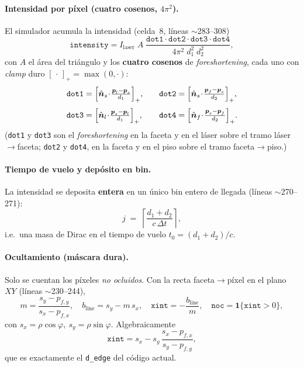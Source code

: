 \documentclass[11pt,a4paper]{article}
\theoremstyle{plain}
\theoremstyle{definition}
\newcommand{\vect}[1]{\boldsymbol{#1}}
\begin{document}
\paragraph{Intensidad por p\'ixel (cuatro cosenos, $4\pi^2$).}
El simulador acumula la intensidad (celda~8, l\'ineas $\sim$283--308)
\begin{equation}
    \texttt{intensity}
    =
    I_{\mathrm{laser}}\; A\;
    \frac{\texttt{dot1}\cdot\texttt{dot2}\cdot\texttt{dot3}\cdot\texttt{dot4}}
         {4\pi^2\; d_1^2\; d_2^2},
    \label{eq:raster-int}
\end{equation}
con $A$ el \'area del tri\'angulo y los \textbf{cuatro cosenos} de
\emph{foreshortening}, cada uno con \emph{clamp} duro $[\,\cdot\,]_+=\max(0,\cdot)$:
\begin{equation}
\begin{aligned}
    \texttt{dot1}&=\Bigl[\hat{\vect n}_s\!\cdot\!\tfrac{\vect{p}_l-\vect{p}_s}{d_1}\Bigr]_+,
    &\quad
    \texttt{dot2}&=\Bigl[\hat{\vect n}_s\!\cdot\!\tfrac{\vect{p}_f-\vect{p}_s}{d_2}\Bigr]_+,\\[3pt]
    \texttt{dot3}&=\Bigl[\hat{\vect n}_l\!\cdot\!\tfrac{\vect{p}_s-\vect{p}_l}{d_1}\Bigr]_+,
    &\quad
    \texttt{dot4}&=\Bigl[\hat{\vect n}_f\!\cdot\!\tfrac{\vect{p}_s-\vect{p}_f}{d_2}\Bigr]_+ .
\end{aligned}
    \label{eq:raster-cos}
\end{equation}
(\texttt{dot1} y \texttt{dot3} son el \emph{foreshortening} en la faceta y en el
l\'aser sobre el tramo l\'aser$\to$faceta; \texttt{dot2} y \texttt{dot4}, en la
faceta y en el piso sobre el tramo faceta$\to$piso.)

\paragraph{Tiempo de vuelo y dep\'osito en bin.}
La intensidad se deposita \textbf{entera} en un \'unico bin entero de llegada
(l\'ineas $\sim$270--271):
\begin{equation}
    j \;=\; \left\lceil \frac{d_1+d_2}{c\,\Delta t} \right\rceil ,
    \label{eq:raster-ceil}
\end{equation}
i.e.\ una masa de Dirac en el tiempo de vuelo $t_0=(d_1+d_2)/c$.

\paragraph{Ocultamiento (m\'ascara dura).}
Solo se cuentan los p\'ixeles \emph{no ocluidos}. Con la recta faceta$\to$p\'ixel
en el plano $XY$ (l\'ineas $\sim$230--244),
\begin{equation}
    m=\frac{s_y-p_{f,y}}{s_x-p_{f,x}},\quad
    b_{\mathrm{line}}=s_y-m\,s_x,\quad
    \texttt{xint}=-\frac{b_{\mathrm{line}}}{m},\quad
    \texttt{noc}=\mathbf 1\{\texttt{xint}>0\},
    \label{eq:raster-noc}
\end{equation}
con $s_x=\rho\cos\varphi,\ s_y=\rho\sin\varphi$. Algebraicamente
\begin{equation}
    \texttt{xint}
    =
    s_x - s_y\,\frac{s_x-p_{f,x}}{s_y-p_{f,y}},
    \label{eq:xint}
\end{equation}
que es exactamente el \texttt{d\_edge} del c\'odigo actual.
\end{document}
